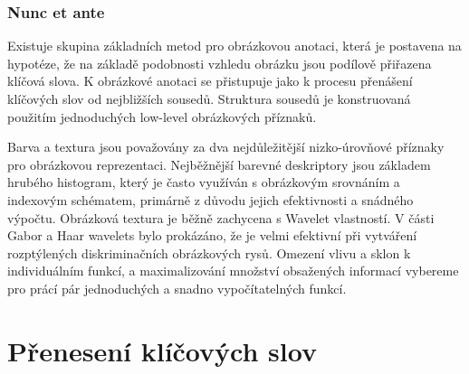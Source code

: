 \documentclass[czech,BP]{thesiskiv}
\begin{document}
\subsection{Nunc et ante}

 Existuje skupina základních metod pro obrázkovou anotaci, která je postavena na hypotéze, že na základě podobnosti vzhledu obrázku jsou podílově přiřazena klíčová slova. K obrázkové anotaci se přistupuje jako k procesu přenášení klíčových slov od nejbližších sousedů. Struktura sousedů je konstruovaná použitím jednoduchých low-level obrázkových příznaků.

Barva a textura jsou považovány za dva nejdůležitější nizko-úrovňové příznaky pro obrázkovou reprezentaci. Nejběžnější barevné deskriptory jsou základem hrubého histogram, který je často využíván s obrázkovým srovnáním a indexovým schématem, primárně z důvodu jejich efektivnosti a snádného výpočtu. Obrázková textura je běžně zachycena s Wavelet vlastností. V části Gabor a Haar wavelets bylo prokázáno, že je velmi efektivní při vytváření rozptýlených diskriminačních obrázkových rysů. Omezení vlivu a sklon k individuálním funkcí, a maximalizování množství obsažených informací vybereme pro prácí pár jednoduchých a snadno vypočítatelných funkcí. 


\chapter{Přenesení klíčových slov}
\end{document}

